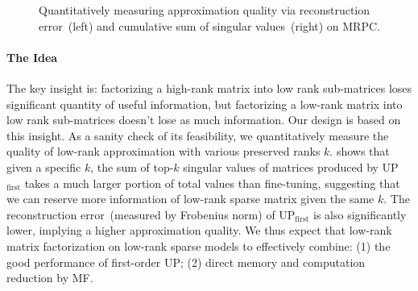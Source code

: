 \begin{figure}[th]
	\centering
	\caption{Quantitatively measuring approximation quality via reconstruction error~(left) and cumulative sum of singular values~(right) on MRPC.}
	\label{fig:norm}
\end{figure}

\paragraph{The Idea}
The key insight is: factorizing a high-rank matrix into low rank sub-matrices
loses significant quantity of useful information, but factorizing a low-rank matrix into low rank sub-matrices
doesn't lose as much information. Our design is based on this insight. 
As a sanity check of its feasibility, we quantitatively measure the 
quality of low-rank approximation with various preserved ranks $k$. 
 shows that given a specific $k$, 
the sum of top-$k$ singular values of matrices produced by UP$_\text{first}$ takes a much larger portion of total values than fine-tuning, suggesting that we can reserve more information of low-rank sparse matrix given the same $k$. The reconstruction error~(measured by Frobenius norm) of UP$_\text{first}$ is also significantly lower, implying a higher approximation quality. We thus expect that low-rank matrix factorization on low-rank sparse models to effectively combine: 
(1) the good performance of first-order UP; 
(2) direct memory and computation reduction by MF.

